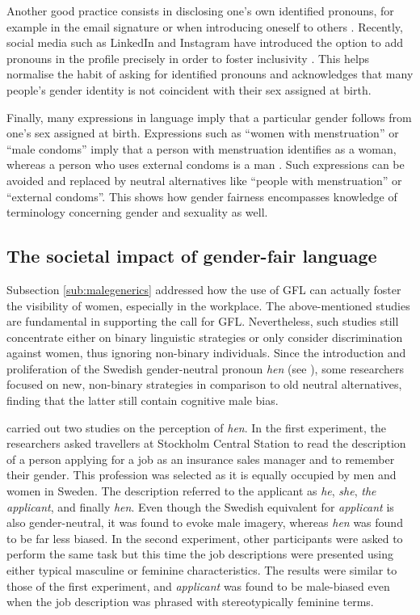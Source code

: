 Another good practice consists in disclosing one's own identified pronouns, for example in the email signature or when introducing oneself to others \citep[23]{boka2021richtlinie}. Recently, social media such as LinkedIn and Instagram have introduced the option to add pronouns in the profile precisely in order to foster inclusivity \citep{linkedinpronouns,instagrampronouns}. This helps normalise the habit of asking for identified pronouns and acknowledges that many people's gender identity is not coincident with their sex assigned at birth. 

Finally, many expressions in language imply that a particular gender follows from one's sex assigned at birth. Expressions such as ``women with menstruation'' or ``male condoms'' imply that a person with menstruation identifies as a woman, whereas a person who uses external condoms is a man \citep[33]{boka2021richtlinie}. Such expressions can be avoided and replaced by neutral alternatives like ``people with menstruation'' or ``external condoms''. This shows how gender fairness encompasses knowledge of terminology concerning gender and sexuality as well.

\subsection{The societal impact of gender-fair language} \label{sec:impactgfl}

Subsection \ref{sub:malegenerics} addressed how the use of GFL can actually foster the visibility of women, especially in the workplace. The above-mentioned studies are fundamental in supporting the call for GFL. Nevertheless, such studies still concentrate either on binary linguistic strategies or only consider discrimination against women, thus ignoring non-binary individuals. Since the introduction and proliferation of the Swedish gender-neutral pronoun \textit{hen} (see \cite{gustafsson2015introducing}), some researchers focused on new, non-binary strategies in comparison to old neutral alternatives, finding that the latter still contain cognitive male bias.

\textcite{back2015hen} carried out two studies on the perception of \textit{hen}. In the first experiment, the researchers asked travellers at Stockholm Central Station to read the description of a person applying for a job as an insurance sales manager and to remember their gender. This profession was selected as it is equally occupied by men and women in Sweden. The description referred to the applicant as \textit{he}, \textit{she}, \textit{the applicant}, and finally \textit{hen}. Even though the Swedish equivalent for \textit{applicant} is also gender-neutral, it was found to evoke male imagery, whereas \textit{hen} was found to be far less biased. In the second experiment, other participants were asked to perform the same task but this time the job descriptions were presented using either typical masculine or feminine characteristics. The results were similar to those of the first experiment, and \textit{applicant} was found to be male-biased even when the job description was phrased with stereotypically feminine terms. 


